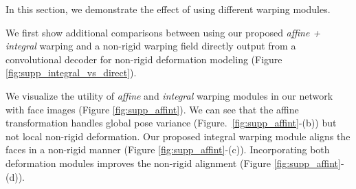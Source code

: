 \documentclass[runningheads]{llncs}
\begin{document}
In this section, we demonstrate the effect of using different warping modules.

We first show additional comparisons between using our proposed \emph{affine + integral} warping and a non-rigid warping field directly output from a convolutional decoder for non-rigid deformation modeling (Figure \ref{fig:supp_integral_vs_direct}).

We visualize the utility of \textit{affine} and \textit{integral} warping modules in our network with face images (Figure \ref{fig:supp_affint}). We can see that the affine transformation handles global pose variance (Figure.~\ref{fig:supp_affint}-(b)) but not local non-rigid deformation. Our proposed integral warping module aligns the faces in a non-rigid manner (Figure \ref{fig:supp_affint}-(c)). Incorporating both deformation modules improves the non-rigid alignment (Figure \ref{fig:supp_affint}-(d)).
\end{document}
